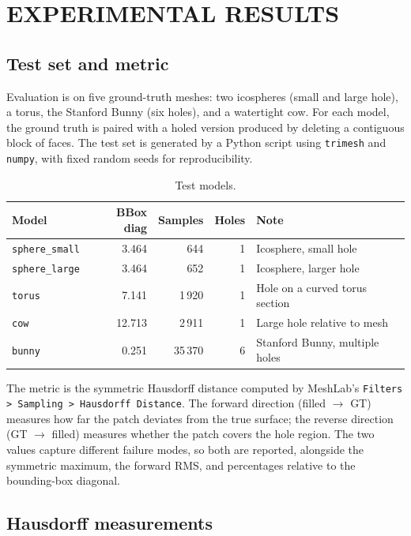 \chapter{EXPERIMENTAL RESULTS}

\section{Test set and metric}

Evaluation is on five ground-truth meshes: two icospheres (small and large hole), a torus, the Stanford Bunny (six holes), and a watertight cow. For each model, the ground truth is paired with a holed version produced by deleting a contiguous block of faces. The test set is generated by a Python script using \texttt{trimesh} and \texttt{numpy}, with fixed random seeds for reproducibility.

\begin{table}[H]
\centering
\caption{Test models.}
\label{tab:dataset}
\begin{tabularx}{\textwidth}{l r r r X}
\toprule
\textbf{Model} & \textbf{BBox diag} & \textbf{Samples} & \textbf{Holes} & \textbf{Note} \\
\midrule
\texttt{sphere\_small} & 3.464  & 644    & 1 & Icosphere, small hole \\
\texttt{sphere\_large} & 3.464  & 652    & 1 & Icosphere, larger hole \\
\texttt{torus}         & 7.141  & 1\,920 & 1 & Hole on a curved torus section \\
\texttt{cow}           & 12.713 & 2\,911 & 1 & Large hole relative to mesh \\
\texttt{bunny}         & 0.251  & 35\,370 & 6 & Stanford Bunny, multiple holes \\
\bottomrule
\end{tabularx}
\end{table}

The metric is the symmetric Hausdorff distance computed by MeshLab's \texttt{Filters > Sampling > Hausdorff Distance}. The forward direction (filled $\to$ GT) measures how far the patch deviates from the true surface; the reverse direction (GT $\to$ filled) measures whether the patch covers the hole region. The two values capture different failure modes, so both are reported, alongside the symmetric maximum, the forward RMS, and percentages relative to the bounding-box diagonal.

\section{Hausdorff measurements}

